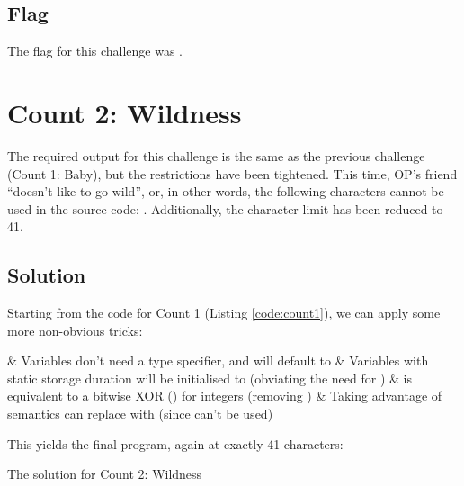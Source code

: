 
	\subsection{Flag}

		The flag for this challenge was .





\pagebreak
\section{Count 2: Wildness}

	The required output for this challenge is the same as the previous challenge (Count 1: Baby), but the restrictions have been
	tightened. This time, OP's friend \enquote{doesn't like to go wild}, or, in other words, the following characters cannot be
	used in the source code: . Additionally, the character limit has been reduced to \num{41}.

	\subsection{Solution}

		Starting from the code for Count 1 (Listing \ref{code:count1}), we can apply some more non-obvious tricks:

		\begin{bulletlist}
			& Variables don't need a type specifier, and will default to 
			& Variables with static storage duration will be initialised to  (obviating the need for \ttt{=})
			& \ttt{!=} is equivalent to a bitwise XOR (\ttt{\^{}}) for integers (removing \ttt{<})
			& Taking advantage of  semantics can replace  with  (since  can't be used)
		\end{bulletlist}

		This yields the final program, again at exactly \num{41} characters:

		\begin{listing}[!htbp]
			\caption{The solution for Count 2: Wildness}
		\end{listing}



